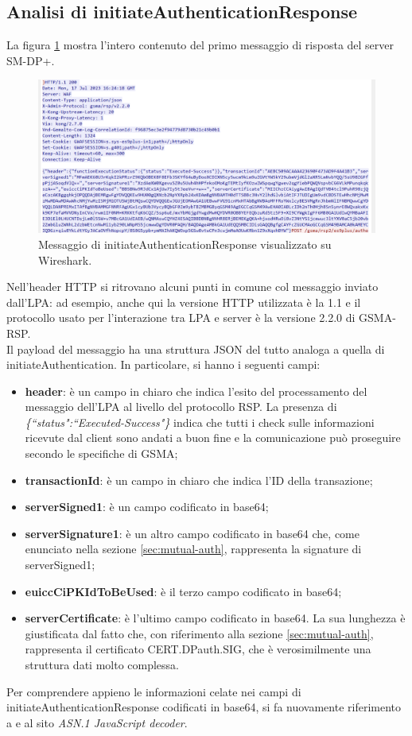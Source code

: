 \documentclass[10pt, oneside]{book}
\begin{document}
\subsection{Analisi di initiateAuthenticationResponse}
La figura \ref{fig:msg2-stream-pcap} mostra l'intero contenuto del primo messaggio di risposta del server SM-DP+.\\
\begin{figure}
\includegraphics[width=\linewidth]{msg2-stream-pcap.png}
\caption{Messaggio di initiateAuthenticationResponse visualizzato su Wireshark.}
\label{fig:msg2-stream-pcap}
\end{figure}
Nell'header HTTP si ritrovano alcuni punti in comune col messaggio inviato dall'LPA: ad esempio, anche qui la versione HTTP utilizzata è la 1.1 e il protocollo usato per l'interazione tra LPA e server è la versione 2.2.0 di GSMA-RSP.\\

\noindent Il payload del messaggio ha una struttura JSON del tutto analoga a quella di initiateAuthentication. In particolare, si hanno i seguenti campi:
\begin{itemize}
\item \textbf{header}: è un campo in chiaro che indica l'esito del processamento del messaggio dell'LPA al livello del protocollo RSP. La presenza di \textit{\{``status":``Executed-Success"\}} indica che tutti i check sulle informazioni ricevute dal client sono andati a buon fine e la comunicazione può proseguire secondo le specifiche di GSMA;
\item \textbf{transactionId}: è un campo in chiaro che indica l'ID della transazione;
\item \textbf{serverSigned1}: è un campo codificato in base64;
\item \textbf{serverSignature1}: è un altro campo codificato in base64 che, come enunciato nella sezione \ref{sec:mutual-auth}, rappresenta la signature di serverSigned1;
\item \textbf{euiccCiPKIdToBeUsed}: è il terzo campo codificato in base64;
\item \textbf{serverCertificate}: è l'ultimo campo codificato in base64. La sua lunghezza è giustificata dal fatto che, con riferimento alla sezione \ref{sec:mutual-auth}, rappresenta il certificato CERT.DPauth.SIG, che è verosimilmente una struttura dati molto complessa.
\end{itemize}
Per comprendere appieno le informazioni celate nei campi di initiateAuthenticationResponse codificati in base64, si fa nuovamente riferimento a \cite{RSP-definitions} e al sito \textit{ASN.1 JavaScript decoder}.\\
\end{document}
